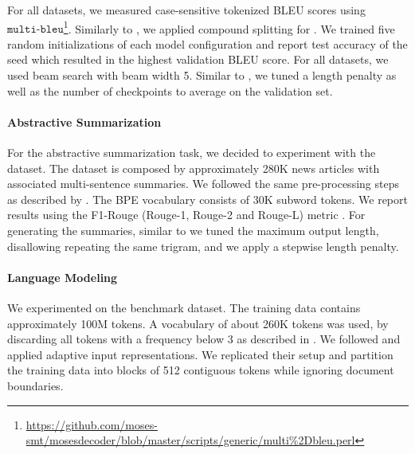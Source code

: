 \documentclass{article}
\begin{document}
For all datasets, we measured case-sensitive tokenized BLEU scores using $\texttt{multi-bleu}$\footnote{\url{https://github.com/moses-smt/mosesdecoder/blob/master/scripts/generic/multi\%2Dbleu.perl}}. Similarly to \citet{vaswani2017attention}, we applied compound splitting for \ende{}. We trained five random initializations of each model configuration and report test accuracy of the seed which resulted in the highest validation BLEU score. For all datasets, we used beam search with beam width 5. Similar to \citet{wu2019pay}, we tuned a length penalty as well as the number of checkpoints to average on the validation set.

\paragraph{Abstractive Summarization} For the abstractive summarization task, we decided to experiment with the \cnndm{} \cite{10.5555/2969239.2969428,nallapati-etal-2016-abstractive} dataset. The dataset is composed by approximately 280K news articles with associated multi-sentence summaries. We followed the same pre-processing steps as described by \citet{wu2019pay}. The BPE vocabulary consists of 30K subword tokens. We report results using the F1-Rouge (Rouge-1, Rouge-2 and Rouge-L) metric \cite{lin-2004-rouge}. For generating the summaries, similar to \citet{wu2019pay} we tuned the maximum output length, disallowing repeating the same trigram, and we apply a stepwise length penalty.

\paragraph{Language Modeling} We experimented on the \wiki{} \cite{DBLP:journals/corr/MerityXBS16} benchmark dataset. The training data contains approximately 100M tokens. A vocabulary of about 260K tokens was used, by discarding all tokens with a frequency below 3 as described in \citet{DBLP:journals/corr/MerityXBS16}. We followed \citet{DBLP:journals/corr/abs-1809-10853} and applied adaptive input representations. We replicated their setup and partition the training data into blocks of 512 contiguous tokens while ignoring document boundaries.
\end{document}
